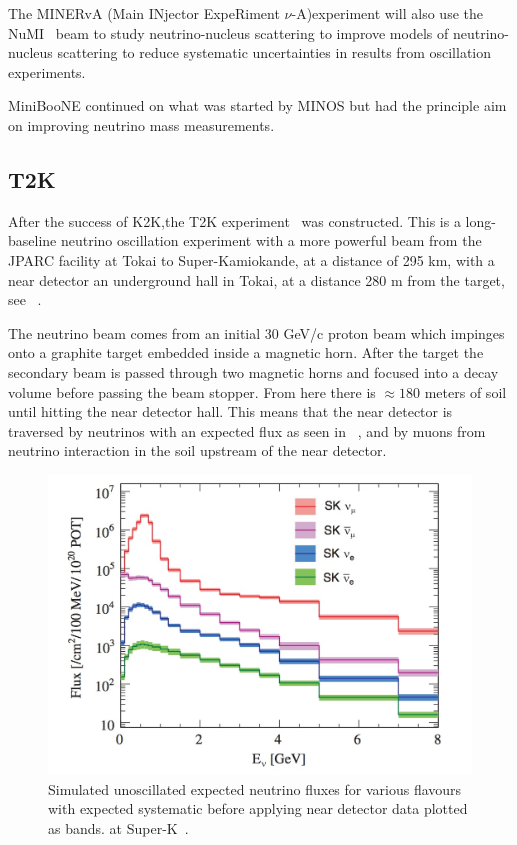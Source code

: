 The MINERvA (Main INjector ExpeRiment $\nu$-A)experiment \cite{39minerva} will also use the NuMI~\cite{19NuMI} beam to study neutrino-nucleus scattering to improve models of neutrino-nucleus scattering to reduce systematic uncertainties in results from oscillation experiments.

MiniBooNE\cite{41MiniBooNE} continued on what was started by MINOS but had the principle aim on improving neutrino mass measurements.

\subsection{T2K}


After the success of K2K,the T2K experiment~\cite{21T2K} was constructed. This is a long-baseline neutrino oscillation experiment with a more powerful beam from the JPARC facility at Tokai to Super-Kamiokande, at a distance of 295 km, with a near detector an underground hall in Tokai, at a distance 280 m from the target, see ~.

The neutrino beam comes from an initial 30 GeV/c proton beam which impinges onto a graphite target embedded inside a magnetic horn. After the target the secondary beam is passed through two magnetic horns and focused into a decay volume before passing the beam stopper. From here there is $\approx180$ meters of soil until hitting the near detector hall. This means that the near detector is traversed by neutrinos with an expected flux as seen in ~, and by muons from neutrino interaction in the soil upstream of the near detector. 

\begin{figure}[h!]
\centering
  \centering
\includegraphics[width=\textwidth]{figures/ND280Flux.jpeg}
\vspace{2mm}
\caption{Simulated unoscillated expected neutrino fluxes for various flavours with expected systematic before applying near detector data plotted as bands. at Super-K~\cite{21T2K}.}
\label{fig:ND280Flux}
\end{figure}

